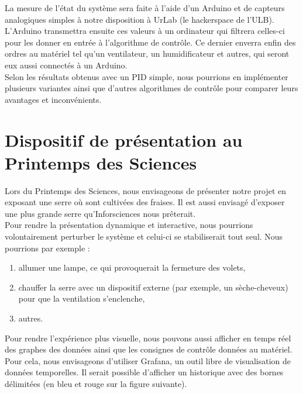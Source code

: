 \documentclass[a4paper,10pt]{article}
\begin{document}
La mesure de l'état du système sera faite à l'aide d'un Arduino et de capteurs analogiques simples à notre disposition à UrLab (le hackerspace de l'ULB). L'Arduino transmettra ensuite ces valeurs à un ordinateur qui filtrera celles-ci pour les donner en entrée à l'algorithme de contrôle. Ce dernier enverra enfin des ordres au matériel tel qu'un ventilateur, un humidificateur et autres, qui seront eux aussi connectés à un Arduino.\\

Selon les résultats obtenus avec un PID simple, nous pourrions en implémenter plusieurs variantes ainsi que d'autres algorithmes de contrôle pour comparer leurs avantages et inconvénients.

\section{Dispositif de présentation au Printemps des Sciences}

Lors du Printemps des Sciences, nous envisageons de présenter notre projet en exposant une serre où sont cultivées des fraises. Il est aussi envisagé d'exposer une plus grande serre qu'Inforsciences nous prêterait.\\

Pour rendre la présentation dynamique et interactive, nous pourrions volontairement perturber le système et celui-ci se stabiliserait tout seul. Nous pourrions par exemple :
\begin{enumerate}
	\item allumer une lampe, ce qui provoquerait la fermeture des volets,
	\item chauffer la serre avec un dispositif externe (par exemple, un sèche-cheveux) pour que la ventilation s'enclenche,
	\item autres. \\
\end{enumerate}

Pour rendre l'expérience plus visuelle, nous pouvons aussi afficher en temps réel des graphes des données ainsi que les consignes de contrôle données au matériel. Pour cela, nous envisageons d'utiliser Grafana, un outil libre de visualisation de données temporelles. Il serait possible d'afficher un historique avec des bornes délimitées (en bleu et rouge sur la figure suivante). \\
\end{document}
